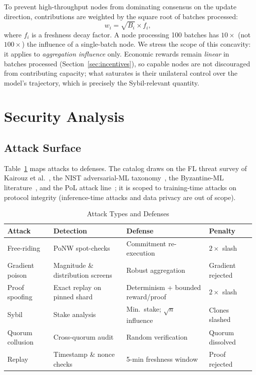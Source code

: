 \documentclass[conference]{IEEEtran}
\begin{document}
To prevent high-throughput nodes from dominating consensus on the update direction, contributions are weighted by the square root of batches processed:
\begin{equation}
w_i = \sqrt{B_i} \times f_i, \label{eq:sqrtn}
\end{equation}
where $f_i$ is a freshness decay factor. A node processing 100 batches has $10\times$ (not $100\times$) the influence of a single-batch node. We stress the scope of this concavity: it applies to \emph{aggregation influence} only. Economic rewards remain \emph{linear} in batches processed (Section~\ref{sec:incentives}), so capable nodes are not discouraged from contributing capacity; what saturates is their unilateral control over the model's trajectory, which is precisely the Sybil-relevant quantity.

\section{Security Analysis}
\label{sec:security}

\subsection{Attack Surface}

Table~\ref{tab:attacks} maps attacks to defenses. The catalog draws on the FL threat survey of Kairouz et al.~\cite{kairouz2021advances}, the NIST adversarial-ML taxonomy~\cite{vassilev2024adversarial}, the Byzantine-ML literature~\cite{blanchard2017machine,yin2018byzantine}, and the PoL attack line~\cite{zhang2022adversarial,fang2023proof}; it is scoped to training-time attacks on protocol integrity (inference-time attacks and data privacy are out of scope).

\begin{table}[t]
\caption{Attack Types and Defenses}
\label{tab:attacks}
\centering
\small
\begin{tabular}{@{}p{1.5cm}p{2.0cm}p{2.0cm}p{1.5cm}@{}}
\toprule
\textbf{Attack} & \textbf{Detection} & \textbf{Defense} & \textbf{Penalty} \\
\midrule
Free-riding & PoNW spot-checks & Commitment re-execution & $2\times$ slash \\
Gradient poison & Magnitude \& distribution screens & Robust aggregation & Gradient rejected \\
Proof spoofing & Exact replay on pinned shard & Determinism + bounded reward/proof & $2\times$ slash \\
Sybil & Stake analysis & Min.\ stake; $\sqrt{n}$ influence & Clones slashed \\
Quorum collusion & Cross-quorum audit & Random verification & Quorum dissolved \\
Replay & Timestamp \& nonce checks & 5-min freshness window & Proof rejected \\
\bottomrule
\end{tabular}
\end{table}
\end{document}
